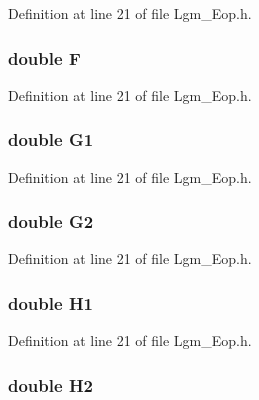 Definition at line 21 of file Lgm\_\-Eop.h.\hypertarget{struct_lgm___nga_eopp_e3520ebb3ff8d6feab3e6afb47ed4040}{
\subsubsection[{F}]{\setlength{\rightskip}{0pt plus 5cm}double {\bf F}}}
\label{struct_lgm___nga_eopp_e3520ebb3ff8d6feab3e6afb47ed4040}




Definition at line 21 of file Lgm\_\-Eop.h.\hypertarget{struct_lgm___nga_eopp_f7e0bafaf7137cdfe22fad3458770bbc}{
\subsubsection[{G1}]{\setlength{\rightskip}{0pt plus 5cm}double {\bf G1}}}
\label{struct_lgm___nga_eopp_f7e0bafaf7137cdfe22fad3458770bbc}




Definition at line 21 of file Lgm\_\-Eop.h.\hypertarget{struct_lgm___nga_eopp_0039b6c763d839473c0f91c2d3fb1586}{
\subsubsection[{G2}]{\setlength{\rightskip}{0pt plus 5cm}double {\bf G2}}}
\label{struct_lgm___nga_eopp_0039b6c763d839473c0f91c2d3fb1586}




Definition at line 21 of file Lgm\_\-Eop.h.\hypertarget{struct_lgm___nga_eopp_fa5f25beeda3aece1803a92b64262dab}{
\subsubsection[{H1}]{\setlength{\rightskip}{0pt plus 5cm}double {\bf H1}}}
\label{struct_lgm___nga_eopp_fa5f25beeda3aece1803a92b64262dab}




Definition at line 21 of file Lgm\_\-Eop.h.\hypertarget{struct_lgm___nga_eopp_ab6041131b2e33076efab27de0a33da9}{
\subsubsection[{H2}]{\setlength{\rightskip}{0pt plus 5cm}double {\bf H2}}}
\label{struct_lgm___nga_eopp_ab6041131b2e33076efab27de0a33da9}





